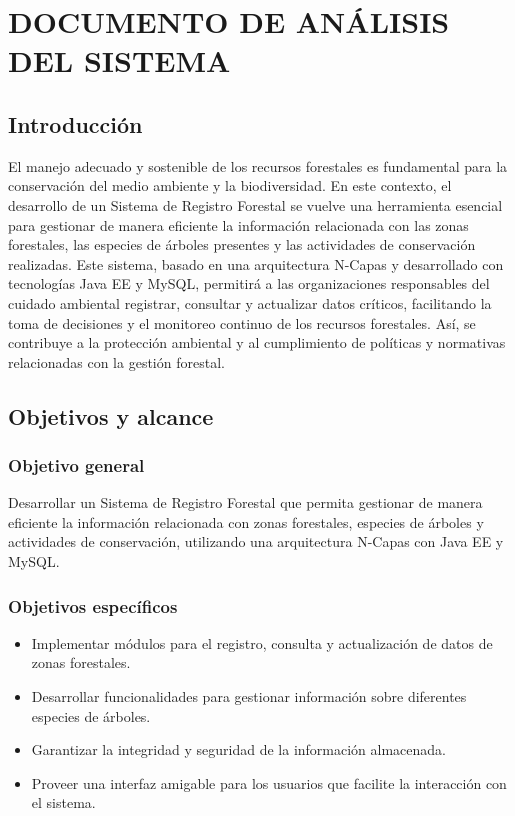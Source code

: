 \section{DOCUMENTO DE ANÁLISIS DEL SISTEMA}
\subsection{Introducción}
El manejo adecuado y sostenible de los recursos forestales es fundamental para la conservación del medio ambiente y la biodiversidad. En este contexto, el desarrollo de un Sistema de Registro Forestal se vuelve una herramienta esencial para gestionar de manera eficiente la información relacionada con las zonas forestales, las especies de árboles presentes y las actividades de conservación realizadas. Este sistema, basado en una arquitectura N-Capas y desarrollado con tecnologías Java EE y MySQL, permitirá a las organizaciones responsables del cuidado ambiental registrar, consultar y actualizar datos críticos, facilitando la toma de decisiones y el monitoreo continuo de los recursos forestales. Así, se contribuye a la protección ambiental y al cumplimiento de políticas y normativas relacionadas con la gestión forestal.

\subsection{Objetivos y alcance}
\subsubsection{Objetivo general}
Desarrollar un Sistema de Registro Forestal que permita gestionar de manera eficiente la información relacionada con zonas forestales, especies de árboles y actividades de conservación, utilizando una arquitectura N-Capas con Java EE y MySQL.

\subsubsection{Objetivos específicos}
\begin{itemize}
    \item Implementar módulos para el registro, consulta y actualización de datos de zonas forestales.
    \item Desarrollar funcionalidades para gestionar información sobre diferentes especies de árboles.
    \item Garantizar la integridad y seguridad de la información almacenada.
    \item Proveer una interfaz amigable para los usuarios que facilite la interacción con el sistema.
\end{itemize}

